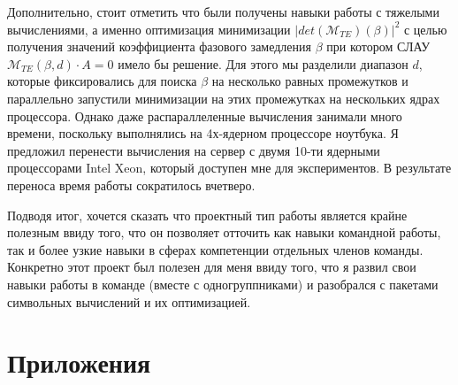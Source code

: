\documentclass{article}
\begin{document}
Дополнительно, стоит отметить что были получены навыки работы с тяжелыми вычислениями, а именно оптимизация минимизации $|det(\mathcal{M}_{TE})(\beta)|^2$ с целью получения значений коэффициента фазового замедления $\beta$ при котором СЛАУ $\mathcal{M}_{TE}(\beta, d) \cdot A = 0$ имело бы решение. Для этого мы разделили диапазон $d$, которые фиксировались для поиска $\beta$ на несколько равных промежутков и параллельно запустили минимизации на этих промежутках на нескольких ядрах процессора. Однако даже распараллеленные вычисления занимали много времени, поскольку выполнялись на 4х-ядерном процессоре ноутбука. Я предложил перенести вычисления на сервер с двумя 10-ти ядерными процессорами Intel Xeon, который доступен мне для экспериментов. В результате переноса время работы сократилось вчетверо.

Подводя итог, хочется сказать что проектный тип работы является крайне полезным ввиду того, что он позволяет отточить как навыки командной работы, так и более узкие навыки в сферах компетенции отдельных членов команды. Конкретно этот проект был полезен для меня ввиду того, что я развил свои навыки работы в команде (вместе с одногруппниками) и разобрался с пакетами символьных вычислений и их оптимизацией. 


\newpage




\newpage

\section*{Приложения}
\end{document}
